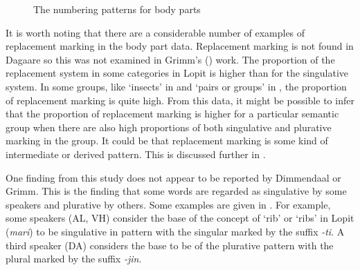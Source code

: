 \documentclass[output=paper]{langsci/langscibook}
\begin{document}
\begin{figure}
\caption{The numbering patterns for body parts}
\label{fig:moodie:2}
\end{figure}

It is worth noting that there are a considerable number of examples of replacement marking in the body part data. Replacement marking is not found in Dagaare so this was not examined in Grimm’s (\citeyear{Grimm2012}) work. The proportion of the replacement system in some categories in Lopit is higher than for the singulative system.  In some groups, like ‘insects’ in  and  ‘pairs or groups’ in , the proportion of replacement marking is quite high. From this data, it might be possible to infer that the proportion of replacement marking is higher for a particular semantic group when there are also high proportions of both singulative and plurative marking in the group. It could be that replacement marking is some kind of intermediate or derived pattern.  This is discussed further in .

One finding from this study does not appear to be reported by Dimmendaal or Grimm. This is the finding that some words are regarded as singulative by some speakers and plurative by others. Some examples are given in . For example, some speakers (AL, VH) consider the base of the concept of ‘rib’ or ‘ribs’ in Lopit (\textit{mari}) to be singulative in pattern with the singular marked by the suffix \textit{-ti}. A third speaker (DA) considers the base to be of the plurative pattern with the plural marked by the suffix \textit{-jin}. 
\end{document}

